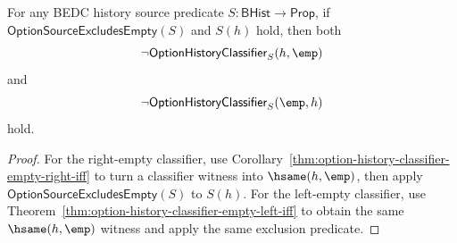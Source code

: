\begin{theorem}
\label{thm:option-history-classifier-absent-source-separation}
For any BEDC history source predicate $S:\mathsf{BHist}\to\mathsf{Prop}$, if
$\mathsf{OptionSourceExcludesEmpty}(S)$ and $S(h)$ hold, then both
$$
\neg\mathsf{OptionHistoryClassifier}_S(h,\emp)
$$
and
$$
\neg\mathsf{OptionHistoryClassifier}_S(\emp,h)
$$
hold.
\end{theorem}
\begin{proof}
For the right-empty classifier, use
Corollary~\ref{thm:option-history-classifier-empty-right-iff} to turn a classifier
witness into $\hsame(h,\emp)$, then apply
$\mathsf{OptionSourceExcludesEmpty}(S)$ to $S(h)$. For the left-empty
classifier, use Theorem~\ref{thm:option-history-classifier-empty-left-iff} to
obtain the same $\hsame(h,\emp)$ witness and apply the same exclusion predicate.
\end{proof}
